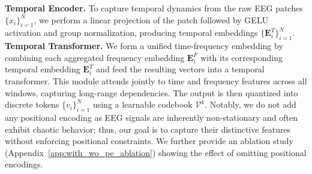 \noindent\textbf{Temporal Encoder. } To capture temporal dynamics from the raw EEG patches $\{x_i\}_{i=1}^{N}$, we perform a linear projection of the patch followed by GELU\cite{hendrycks2016gaussian} activation and group normalization, producing temporal embeddings $\{\mathbf{E}^T_i\}_{i=1}^N$. \\



\noindent\textbf{Temporal Transformer. } We form a unified time-frequency embedding by combining each aggregated frequency embedding $\mathbf{E}_i^F$ with its corresponding temporal embedding $\mathbf{E}_i^T$ and feed the resulting vectors into a temporal transformer. This module attends jointly to time and frequency features across all windows, capturing long-range dependencies. The output is then quantized into discrete tokens $\{v_i\}_{i=1}^N$ using a learnable codebook $\mathcal{V}^k$. Notably, we do not add any positional encoding as EEG signals are inherently non-stationary and often exhibit chaotic behavior; thus, our goal is to capture their distinctive features without enforcing positional constraints. 
We further provide an ablation study (Appendix~\ref{app:with_wo_pe_ablation}) showing the effect of omitting positional encodings.\\






